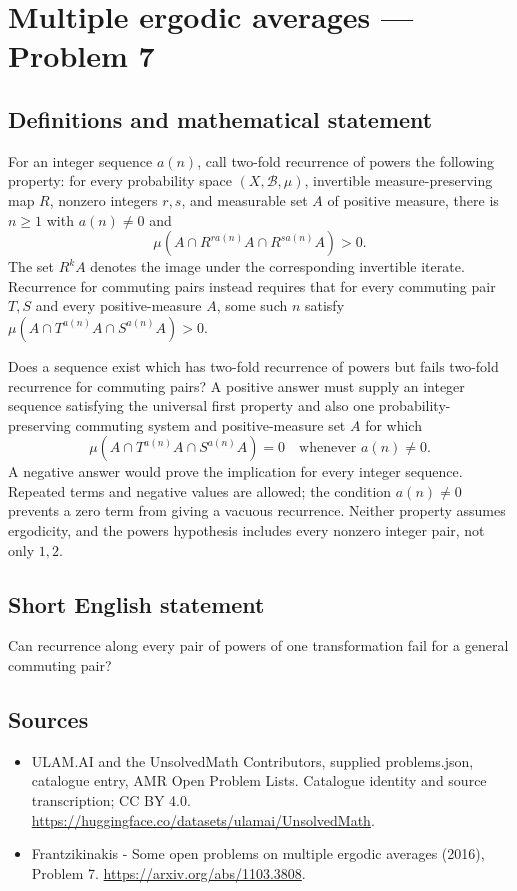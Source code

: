 \documentclass[11pt,a4paper]{article}
\begin{document}
\section*{Multiple ergodic averages — Problem 7}\label{statement}

\subsection{Definitions and mathematical statement}
For an integer sequence $a(n)$, call two-fold recurrence
of powers the following property: for every probability
space $(X,\mathcal B,\mu)$, invertible measure-preserving
map $R$, nonzero integers $r,s$, and measurable set $A$
of positive measure, there is $n\ge1$ with $a(n)\ne0$ and
\[
                    \mu(A\cap R^{r a(n)}A
                              \cap R^{s a(n)}A)>0.
\]
The set $R^kA$ denotes the image under the corresponding
invertible iterate. Recurrence for commuting pairs instead
requires that for every commuting pair $T,S$ and every
positive-measure $A$, some such $n$ satisfy
$\mu(A\cap T^{a(n)}A\cap S^{a(n)}A)>0$.

Does a sequence exist which has two-fold recurrence of
powers but fails two-fold recurrence for commuting pairs?
A positive answer must supply an integer sequence satisfying
the universal first property and also one probability-preserving
commuting system and positive-measure set $A$ for which
\[
        \mu(A\cap T^{a(n)}A\cap S^{a(n)}A)=0
        \quad\text{whenever }a(n)\ne0.
\]
A negative answer would prove the implication for every
integer sequence. Repeated terms and negative values are
allowed; the condition $a(n)\ne0$ prevents a zero term
from giving a vacuous recurrence. Neither property assumes
ergodicity, and the powers hypothesis includes every nonzero
integer pair, not only $1,2$.
\subsection{Short English statement}
Can recurrence along every pair of powers of one transformation fail for a general commuting pair?
\subsection{Sources}
\begin{itemize}
\item[S1] ULAM.AI and the UnsolvedMath Contributors, supplied problems.json, catalogue entry, AMR Open Problem Lists. Catalogue identity and source transcription; CC BY 4.0.
\url{https://huggingface.co/datasets/ulamai/UnsolvedMath}.
\item[S2] Frantzikinakis - Some open problems on multiple ergodic averages (2016), Problem 7. 
\url{https://arxiv.org/abs/1103.3808}.
\end{itemize}
\end{document}
